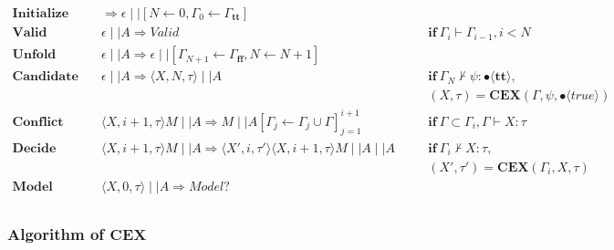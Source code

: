 \documentclass[runningheads]{llncs}
\newcommand\COL{\mathbin{:}}
\newcommand \true {\textbf{tt}}
\newcommand \false {\textbf{ff}}
\newcommand \stypebool {\bullet}
\newcommand \typebool[1]{\stypebool \langle #1 \rangle}
\begin{document}
\begin{align*}
    \textbf{Initialize} &\quad
        \Longrightarrow
        \epsilon \mid \mid [N \leftarrow 0, \Gamma_0 \leftarrow \Gamma_\true]
        &&\\
    \textbf{Valid} &\quad
        \epsilon \mid \mid A \Longrightarrow \textit{Valid}
        &&\quad \textbf{if} \ \Gamma_{i} \vdash \Gamma_{i-1}, i < N
        \\
    \textbf{Unfold} &\quad
        \epsilon \mid \mid A \Longrightarrow
        \epsilon \mid \mid [\Gamma_{N+1} \leftarrow \Gamma_\false, N \leftarrow N + 1]
        &&\\
    \textbf{Candidate} &\quad
        \epsilon \mid \mid A
        \Longrightarrow
        \langle X, N, \tau \rangle \mid \mid A
        && \quad \textbf{if} \ \Gamma_N \not \vdash \psi \COL
        \typebool{\true},\\
        &&&\quad (X, \tau) = \textbf{CEX}(\Gamma, \psi, \typebool{true})
        \\
    \textbf{Conflict} &\quad
        \langle X, i + 1, \tau \rangle M\mid \mid A
        \Longrightarrow
        M \mid \mid A[\Gamma_j \leftarrow \Gamma_j \cup \Gamma]_{j=1}^{i+1}
        &&\quad \textbf{if} \ \Gamma \subset \Gamma_i, \Gamma \vdash X \COL \tau
        \\
    \textbf{Decide} &\quad
        \langle X, i + 1, \tau \rangle M\mid \mid A
        \Longrightarrow
        \langle X', i, \tau' \rangle \langle X, i + 1, \tau \rangle M\mid \mid A \mid \mid A
        &&\quad \textbf{if} \ \Gamma_i \not\vdash X \COL \tau,\\
        &&&\quad (X', \tau') = \textbf{CEX}(\Gamma_i, X, \tau)
        \\
    \textbf{Model} &\quad
        \langle X, 0, \tau \rangle \mid \mid A \Rightarrow Model?
        &&\\
\end{align*}


\subsubsection{Algorithm of \( \mathbf{CEX} \)}
\end{document}
